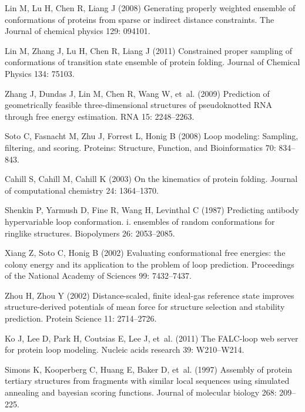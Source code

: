 \begin{thebibliography}{10}
Lin M, Lu H, Chen R, Liang J (2008) Generating properly weighted
ensemble of
  conformations of proteins from sparse or indirect distance constraints.
\newblock The Journal of chemical physics 129: 094101.

Lin M, Zhang J, Lu H, Chen R, Liang J (2011) Constrained proper
sampling of
  conformations of transition state ensemble of protein folding.
\newblock Journal of Chemical Physics 134: 75103.

Zhang J, Dundas J, Lin M, Chen R, Wang W, et~al. (2009) Prediction
of
  geometrically feasible three-dimensional structures of pseudoknotted {RNA}
  through free energy estimation.
\newblock RNA 15: 2248--2263.

Soto C, Fasnacht M, Zhu J, Forrest L, Honig B (2008) Loop modeling:
Sampling,
  filtering, and scoring.
\newblock Proteins: Structure, Function, and Bioinformatics 70: 834--843.

Cahill S, Cahill M, Cahill K (2003) On the kinematics of protein
folding.
\newblock Journal of computational chemistry 24: 1364--1370.

Shenkin P, Yarmush D, Fine R, Wang H, Levinthal C (1987) Predicting
antibody
  hypervariable loop conformation. i. ensembles of random conformations for
  ringlike structures.
\newblock Biopolymers 26: 2053--2085.

Xiang Z, Soto C, Honig B (2002) Evaluating conformational free
energies: the
  colony energy and its application to the problem of loop prediction.
\newblock Proceedings of the National Academy of Sciences 99: 7432--7437.

Zhou H, Zhou Y (2002) Distance-scaled, finite ideal-gas reference
state
  improves structure-derived potentials of mean force for structure selection
  and stability prediction.
\newblock Protein Science 11: 2714--2726.

Ko J, Lee D, Park H, Coutsias E, Lee J, et~al. (2011) The
{FALC}-loop web
  server for protein loop modeling.
\newblock Nucleic acids research 39: W210--W214.

Simons K, Kooperberg C, Huang E, Baker D, et~al. (1997) Assembly of
protein
  tertiary structures from fragments with similar local sequences using
  simulated annealing and bayesian scoring functions.
\newblock Journal of molecular biology 268: 209--225.


\end{thebibliography}
